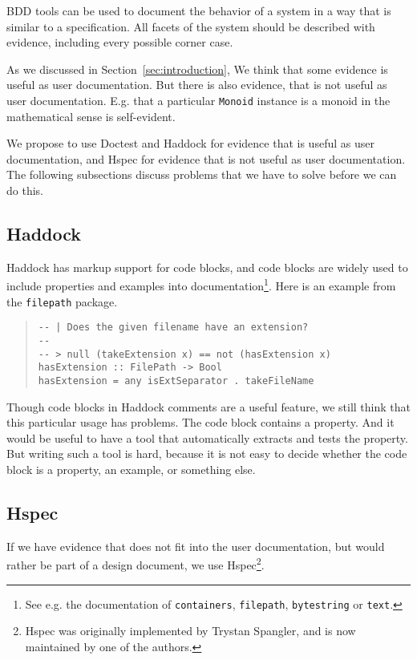 \documentclass[preprint]{sigplanconf}
\begin{document}
BDD tools can be used to document the behavior of a system in a way that
is similar to a specification.  All facets of the system should be
described with evidence, including every possible corner case.

As we discussed in Section~\ref{sec:introduction},
We think that some evidence is useful as user documentation.
But there is also evidence, that is not
useful as user documentation.  E.g. that a particular \texttt{Monoid}
instance is a monoid in the mathematical sense is self-evident.

We propose to use Doctest and Haddock for evidence that is useful as
user documentation, and Hspec for evidence that is not useful as user
documentation.  The following subsections discuss problems that we
have to solve before we can do this.

\subsection{Haddock}
\label{sec:doctest-haddock}

Haddock has markup support for code blocks, and code blocks are widely used
to include properties and examples into documentation\footnote{
See e.g. the documentation of
{\tt containers},
{\tt filepath},
{\tt bytestring} or
{\tt text}.}.
Here is an example from the {\tt filepath} package.

\begin{quote}
\small
\begin{verbatim}
-- | Does the given filename have an extension?
--
-- > null (takeExtension x) == not (hasExtension x)
hasExtension :: FilePath -> Bool
hasExtension = any isExtSeparator . takeFileName
\end{verbatim}
\end{quote}

\noindent Though code blocks in Haddock comments are a useful feature,
we still think that this particular usage has problems.  The code
block contains a property.  And it would be useful to have a tool that
automatically extracts and tests the property.
But writing such a tool is hard, because it is not easy to decide
whether the code block is a property, an example, or something else.

\subsection{Hspec}

If we have evidence that does not fit into the user documentation, but
would rather be part of a design document, we use Hspec\footnote{%
Hspec was originally implemented by Trystan Spangler, and is now
maintained by one of the authors.}.
\end{document}
